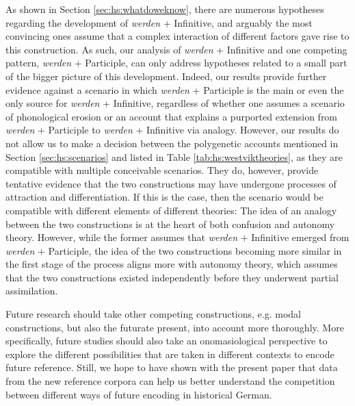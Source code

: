 \documentclass[output=paper,colorlinks,citecolor=brown]{langscibook}
\begin{document}

As shown in Section \ref{sec:hs:whatdoweknow}, there are numerous hypotheses regarding the development of \textit{werden} + Infinitive, and arguably the most convincing ones assume that a complex interaction of different factors gave rise to this construction. As such, our analysis of \textit{werden} + Infinitive and one competing pattern, \textit{werden} + Participle, can only address hypotheses related to a small part of the bigger picture of this development. Indeed, our results provide further evidence against a scenario in which \textit{werden} + Participle is the main or even the only source for \textit{werden} + Infinitive, regardless of whether one assumes a scenario of phonological erosion or an account that explains a purported extension from \textit{werden} + Participle to \textit{werden} + Infinitive via analogy. However, our results do not allow us to make a decision between the polygenetic accounts mentioned in Section \ref{sec:hs:scenarios} and listed in Table \ref{tab:hs:westviktheories}, as they are compatible with multiple conceivable scenarios. They do, however, provide tentative evidence that the two constructions may have undergone processes of attraction and differentiation. If this is the case, then the scenario would be compatible with different elements of different theories: The idea of an analogy between the two constructions is at the heart of both confusion and autonomy theory. However, while the former assumes that \textit{werden} + Infinitive emerged from \textit{werden} + Participle, the idea of the two constructions becoming more similar in the first stage of the process aligns more with autonomy theory, which assumes that the two constructions existed independently before they underwent partial assimilation. 

Future research should take other competing constructions, e.g. modal constructions, but also the futurate present, into account more thoroughly. More specifically, future studies should also take an onomasiological perspective to explore the different possibilities that are taken in different contexts to encode future reference. Still, we hope to have shown with the present paper that data from the new reference corpora can help us better understand the competition between different ways of future encoding in historical German.
\end{document}
